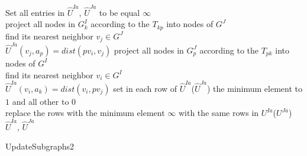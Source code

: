 \documentclass[
	fontsize=12pt,
	paper=a4,
	twoside=false,
	numbers=noenddot,
	plainheadsepline,
	toc=listof,
	toc=bibliography
]{scrartcl}
\begin{document}
\vspace{20pt}
\begin{algorithm}[H]
	\nl Set all entries in $\hat{U}^{Ia}$, $\hat{U}^{Ja}$ to be equal $\infty$ \\
	\nl {}
	{ project all nodes in $G_k^{I}$ according to the $T_{kp}$ into nodes of $G^{J}$ \\
	  { find its nearest neighbor $v_j\in G^{J}$\\
	  	$\hat{U}^{Ja}(v_j, a_p) = dist(pv_i, v_j)$
	  }
	  project all nodes in $G_p^{J}$ according to the $T_{pk}$ into nodes of $G^{I}$ \\
	  { find its nearest neighbor $v_i\in G^{I}$\\
	 	$\hat{U}^{Ia}(v_i, a_k) = dist(v_i, pv_j)$
	  }
	}			
	\nl  set in each row of $\hat{U}^{Ia}$($\hat{U}^{Ja}$) the minimum element to $1$ and all other to $0$\\
	\nl replace the rows with the minimum element $\infty$ with the same rows in $U^{Ia}$($U^{Ja}$) 
	\Return $\hat{U}^{Ia}$, $\hat{U}^{Ja}$
	
	\caption{UpdateSubgraphs2}    \label{alg:update_subgraphs_2}
\end{algorithm}
\end{document}
